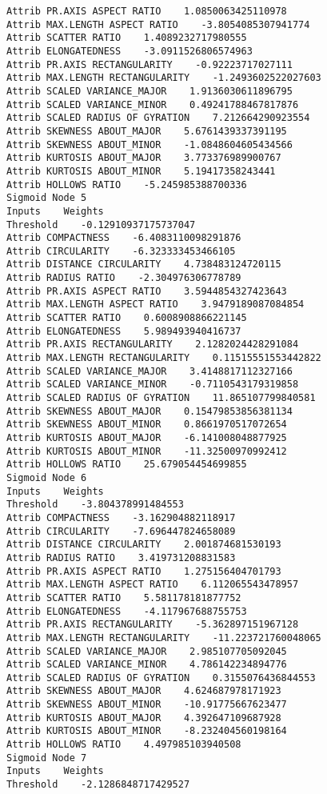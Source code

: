 \documentclass[
	article,			%
	11pt,				%
	oneside,			%
	a4paper,			%
	english,			%
	brazil,				%
	sumario=tradicional
	]{abntex2}
\begin{document}
\begin{lstlisting}
Attrib PR.AXIS ASPECT RATIO    1.0850063425110978
Attrib MAX.LENGTH ASPECT RATIO    -3.8054085307941774
Attrib SCATTER RATIO    1.4089232717980555
Attrib ELONGATEDNESS    -3.0911526806574963
Attrib PR.AXIS RECTANGULARITY    -0.92223717027111
Attrib MAX.LENGTH RECTANGULARITY    -1.2493602522027603
Attrib SCALED VARIANCE_MAJOR    1.9136030611896795
Attrib SCALED VARIANCE_MINOR    0.49241788467817876
Attrib SCALED RADIUS OF GYRATION    7.212664290923554
Attrib SKEWNESS ABOUT_MAJOR    5.6761439337391195
Attrib SKEWNESS ABOUT_MINOR    -1.0848604605434566
Attrib KURTOSIS ABOUT_MAJOR    3.773376989900767
Attrib KURTOSIS ABOUT_MINOR    5.19417358243441
Attrib HOLLOWS RATIO    -5.245985388700336
Sigmoid Node 5
Inputs    Weights
Threshold    -0.12910937175737047
Attrib COMPACTNESS    -6.4083110098291876
Attrib CIRCULARITY    -6.323333453466105
Attrib DISTANCE CIRCULARITY    4.738483124720115
Attrib RADIUS RATIO    -2.304976306778789
Attrib PR.AXIS ASPECT RATIO    3.5944854327423643
Attrib MAX.LENGTH ASPECT RATIO    3.9479189087084854
Attrib SCATTER RATIO    0.6008908866221145
Attrib ELONGATEDNESS    5.989493940416737
Attrib PR.AXIS RECTANGULARITY    2.1282024428291084
Attrib MAX.LENGTH RECTANGULARITY    0.11515551553442822
Attrib SCALED VARIANCE_MAJOR    3.4148817112327166
Attrib SCALED VARIANCE_MINOR    -0.7110543179319858
Attrib SCALED RADIUS OF GYRATION    11.865107799840581
Attrib SKEWNESS ABOUT_MAJOR    0.15479853856381134
Attrib SKEWNESS ABOUT_MINOR    0.8661970517072654
Attrib KURTOSIS ABOUT_MAJOR    -6.141008048877925
Attrib KURTOSIS ABOUT_MINOR    -11.32500970992412
Attrib HOLLOWS RATIO    25.679054454699855
Sigmoid Node 6
Inputs    Weights
Threshold    -3.804378991484553
Attrib COMPACTNESS    -3.162904882118917
Attrib CIRCULARITY    -7.696447824658089
Attrib DISTANCE CIRCULARITY    2.001874681530193
Attrib RADIUS RATIO    3.419731208831583
Attrib PR.AXIS ASPECT RATIO    1.275156404701793
Attrib MAX.LENGTH ASPECT RATIO    6.112065543478957
Attrib SCATTER RATIO    5.581178181877752
Attrib ELONGATEDNESS    -4.117967688755753
Attrib PR.AXIS RECTANGULARITY    -5.362897151967128
Attrib MAX.LENGTH RECTANGULARITY    -11.223721760048065
Attrib SCALED VARIANCE_MAJOR    2.985107705092045
Attrib SCALED VARIANCE_MINOR    4.786142234894776
Attrib SCALED RADIUS OF GYRATION    0.3155076436844553
Attrib SKEWNESS ABOUT_MAJOR    4.624687978171923
Attrib SKEWNESS ABOUT_MINOR    -10.91775667623477
Attrib KURTOSIS ABOUT_MAJOR    4.392647109687928
Attrib KURTOSIS ABOUT_MINOR    -8.232404560198164
Attrib HOLLOWS RATIO    4.497985103940508
Sigmoid Node 7
Inputs    Weights
Threshold    -2.1286848717429527

\end{lstlisting}
\end{document}

